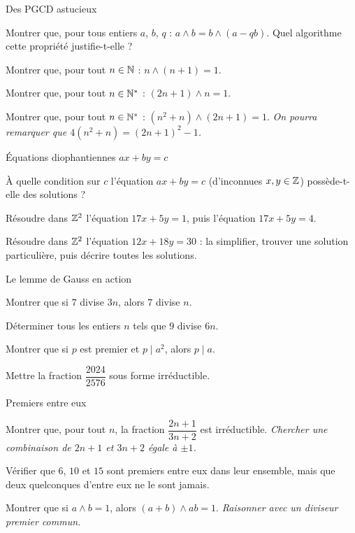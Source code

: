 
\begin{exercice}[2]{Des PGCD astucieux}
\begin{questions}
  \item Montrer que, pour tous entiers $a$, $b$, $q$ :
    $a\wedge b=b\wedge(a-qb)$. Quel algorithme cette propriété justifie-t-elle ?
  \item Montrer que, pour tout $n\in\mathbb{N}$ : $n\wedge(n+1)=1$.
  \item Montrer que, pour tout $n\in\mathbb{N}^{*}$ : $(2n+1)\wedge n=1$.
  \item Montrer que, pour tout $n\in\mathbb{N}^{*}$ : $(n^{2}+n)\wedge(2n+1)=1$.
    \emph{On pourra remarquer que $4(n^{2}+n)=(2n+1)^{2}-1$.}
\end{questions}
\end{exercice}

\begin{exercice}[2]{Équations diophantiennes $ax+by=c$}
\begin{questions}
  \item À quelle condition sur $c$ l'équation $ax+by=c$ (d'inconnues
    $x,y\in\mathbb{Z}$) possède-t-elle des solutions ?
  \item Résoudre dans $\mathbb{Z}^{2}$ l'équation $17x+5y=1$, puis l'équation
    $17x+5y=4$.
  \item Résoudre dans $\mathbb{Z}^{2}$ l'équation $12x+18y=30$ : la simplifier,
    trouver une solution particulière, puis décrire toutes les solutions.
\end{questions}
\end{exercice}

\begin{exercice}[2]{Le lemme de Gauss en action}
\begin{questions}
  \item Montrer que si $7$ divise $3n$, alors $7$ divise $n$.
  \item Déterminer tous les entiers $n$ tels que $9$ divise $6n$.
  \item Montrer que si $p$ est premier et $p\mid a^{2}$, alors $p\mid a$.
  \item Mettre la fraction $\dfrac{2024}{2576}$ sous forme irréductible.
\end{questions}
\end{exercice}

\begin{exercice}[2]{Premiers entre eux}
\begin{questions}
  \item Montrer que, pour tout $n$, la fraction $\dfrac{2n+1}{3n+2}$ est
    irréductible.
    \emph{Chercher une combinaison de $2n+1$ et $3n+2$ égale à $\pm1$.}
  \item Vérifier que $6$, $10$ et $15$ sont premiers entre eux dans leur
    ensemble, mais que deux quelconques d'entre eux ne le sont jamais.
  \item Montrer que si $a\wedge b=1$, alors $(a+b)\wedge ab=1$.
    \emph{Raisonner avec un diviseur premier commun.}
\end{questions}
\end{exercice}

